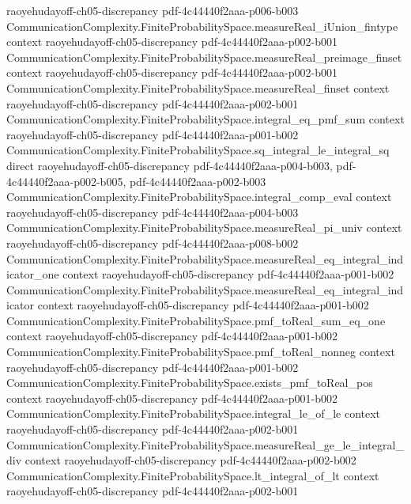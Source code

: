 \begin{lemma}
  {raoyehudayoff-ch05-discrepancy}
  {pdf-4c44440f2aaa-p006-b003}
\proofstep
  {CommunicationComplexity.FiniteProbabilitySpace.measureReal_iUnion_fintype}
  {context}
  {raoyehudayoff-ch05-discrepancy}
  {pdf-4c44440f2aaa-p002-b001}
\proofstep
  {CommunicationComplexity.FiniteProbabilitySpace.measureReal_preimage_finset}
  {context}
  {raoyehudayoff-ch05-discrepancy}
  {pdf-4c44440f2aaa-p002-b001}
\proofstep
  {CommunicationComplexity.FiniteProbabilitySpace.measureReal_finset}
  {context}
  {raoyehudayoff-ch05-discrepancy}
  {pdf-4c44440f2aaa-p002-b001}
\proofstep
  {CommunicationComplexity.FiniteProbabilitySpace.integral_eq_pmf_sum}
  {context}
  {raoyehudayoff-ch05-discrepancy}
  {pdf-4c44440f2aaa-p001-b002}
\proofstep
  {CommunicationComplexity.FiniteProbabilitySpace.sq_integral_le_integral_sq}
  {direct}
  {raoyehudayoff-ch05-discrepancy}
  {pdf-4c44440f2aaa-p004-b003,
    pdf-4c44440f2aaa-p002-b005,
    pdf-4c44440f2aaa-p002-b003}
\proofstep
  {CommunicationComplexity.FiniteProbabilitySpace.integral_comp_eval}
  {context}
  {raoyehudayoff-ch05-discrepancy}
  {pdf-4c44440f2aaa-p004-b003}
\proofstep
  {CommunicationComplexity.FiniteProbabilitySpace.measureReal_pi_univ}
  {context}
  {raoyehudayoff-ch05-discrepancy}
  {pdf-4c44440f2aaa-p008-b002}
\proofstep
  {CommunicationComplexity.FiniteProbabilitySpace.measureReal_eq_integral_indicator_one}
  {context}
  {raoyehudayoff-ch05-discrepancy}
  {pdf-4c44440f2aaa-p001-b002}
\proofstep
  {CommunicationComplexity.FiniteProbabilitySpace.measureReal_eq_integral_indicator}
  {context}
  {raoyehudayoff-ch05-discrepancy}
  {pdf-4c44440f2aaa-p001-b002}
\proofstep
  {CommunicationComplexity.FiniteProbabilitySpace.pmf_toReal_sum_eq_one}
  {context}
  {raoyehudayoff-ch05-discrepancy}
  {pdf-4c44440f2aaa-p001-b002}
\proofstep
  {CommunicationComplexity.FiniteProbabilitySpace.pmf_toReal_nonneg}
  {context}
  {raoyehudayoff-ch05-discrepancy}
  {pdf-4c44440f2aaa-p001-b002}
\proofstep
  {CommunicationComplexity.FiniteProbabilitySpace.exists_pmf_toReal_pos}
  {context}
  {raoyehudayoff-ch05-discrepancy}
  {pdf-4c44440f2aaa-p001-b002}
\proofstep
  {CommunicationComplexity.FiniteProbabilitySpace.integral_le_of_le}
  {context}
  {raoyehudayoff-ch05-discrepancy}
  {pdf-4c44440f2aaa-p002-b001}
\proofstep
  {CommunicationComplexity.FiniteProbabilitySpace.measureReal_ge_le_integral_div}
  {context}
  {raoyehudayoff-ch05-discrepancy}
  {pdf-4c44440f2aaa-p002-b002}
\proofstep
  {CommunicationComplexity.FiniteProbabilitySpace.lt_integral_of_lt}
  {context}
  {raoyehudayoff-ch05-discrepancy}
  {pdf-4c44440f2aaa-p002-b001}
\proofstep

\end{lemma}
